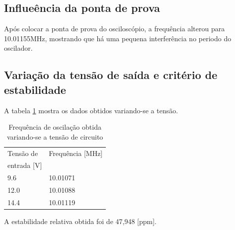 \subsection{Influeência da ponta de prova}
Após colocar a ponta de prova do osciloscópio, a frequência alterou para 10.01155MHz, mostrando que há uma pequena interferência no periodo do oscilador.

\subsection{Variação da tensão de saída e critério de estabilidade}

A tabela \ref{t_estabilidade} mostra os dados obtidos variando-se a tensão.

\begin{small}
	\begin{table}[H]
		\begin{center}
			\caption{Frequência de oscilação obtida variando-se a tensão de circuito}
			\begin{tabular}{l|l}
				\hline
				Tensão de & Frequência [MHz] \\
				entrada [V]&  \\
				\hline
				9.6 & 10.01071 \\
				\hline
				12.0 & 10.01088 \\
				\hline
				14.4 & 10.01119 \\
				\hline
			\end{tabular}
			\label{t_estabilidade}
		\end{center}
	\end{table}
\end{small}

A estabilidade relativa obtida foi de 47,948 [ppm].

